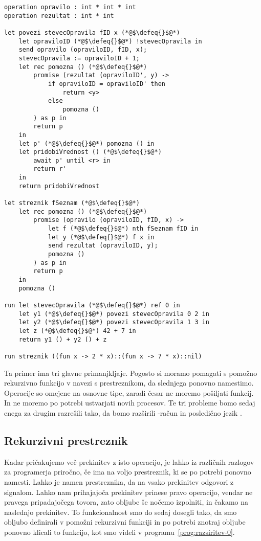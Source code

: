 \begin{lstlisting}[caption={Računanje zahtevne funkcije v ozadju.},label={prog:razsiritev-0},float,floatplacement=h]
operation opravilo : int * int * int
operation rezultat : int * int

let povezi stevecOpravila fID x (*@$\defeq{}$@*)
    let opraviloID (*@$\defeq{}$@*) !stevecOpravila in
    send opravilo (opraviloID, fID, x);
    stevecOpravila := opraviloID + 1;
    let rec pomozna () (*@$\defeq{}$@*)
    	promise (rezultat (opraviloID', y) ->
    		if opraviloID = opraviloID' then
    			return <y>
    		else
    			pomozna ()
    	) as p in
    	return p
    in
    let p' (*@$\defeq{}$@*) pomozna () in
    let pridobiVrednost () (*@$\defeq{}$@*)
    	await p' until <r> in
    	return r'
    in
    return pridobiVrednost

let streznik fSeznam (*@$\defeq{}$@*)
    let rec pomozna () (*@$\defeq{}$@*)
    	promise (opravilo (opraviloID, fID, x) ->
    		let f (*@$\defeq{}$@*) nth fSeznam fID in
    		let y (*@$\defeq{}$@*) f x in
    		send rezultat (opraviloID, y);
    		pomozna ()
    	) as p in
    	return p
    in
    pomozna ()

run	let stevecOpravila (*@$\defeq{}$@*) ref 0 in
    let y1 (*@$\defeq{}$@*) povezi stevecOpravila 0 2 in
    let y2 (*@$\defeq{}$@*) povezi stevecOpravila 1 3 in
    let z (*@$\defeq{}$@*) 42 + 7 in
    return y1 () + y2 () + z

run streznik ((fun x -> 2 * x)::(fun x -> 7 * x)::nil)
\end{lstlisting}


Ta primer ima tri glavne primanjkljaje. Pogosto si moramo pomagati s pomožno rekurzivno funkcijo v navezi s prestreznikom, da slednjega ponovno namestimo. Operacije so omejene na osnovne tipe, zaradi česar ne moremo pošiljati funkcij. In ne moremo po potrebi ustvarjati novih procesov.
Te tri probleme bomo sedaj enega za drugim razrešili tako, da bomo razširili \lae{}-račun in posledično jezik \aeff{}.


\subsection{Rekurzivni prestreznik}


Kadar pričakujemo več prekinitev z isto operacijo, je lahko iz različnih razlogov za programerja priročno, če ima na voljo prestreznik, ki se po potrebi ponovno namesti. Lahko je namen prestreznika, da na vsako prekinitev odgovori z signalom. Lahko nam prihajajoča prekinitev prinese pravo operacijo, vendar ne pravega pripadajočega tovora, zato obljube še nočemo izpolniti, in čakamo na naslednjo prekinitev.
To funkcionalnost smo do sedaj dosegli tako, da smo obljubo definirali v pomožni rekurzivni funkciji in po potrebi znotraj obljube ponovno klicali to funkcijo, kot smo videli v programu~\ref{prog:razsiritev-0}.


